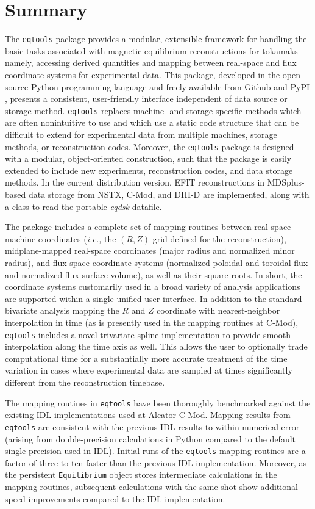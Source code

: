 \documentclass{elsarticle}
\newcommand{\ie}{\emph{i.e., }}
\newcommand{\eqtools}{\texttt{eqtools}\xspace}
\begin{document}
\section{Summary}\label{sec:summary}

The \eqtools package provides a modular, extensible framework for handling the basic tasks associated with magnetic equilibrium reconstructions for tokamaks -- namely, accessing derived quantities and mapping between real-space and flux coordinate systems for experimental data.
This package, developed in the open-source Python programming language and freely available from Github and PyPI \cite{eqtools_pypi,eqtools_git,eqtools_readthedocs}, presents a consistent, user-friendly interface independent of data source or storage method.
\eqtools replaces machine- and storage-specific methods which are often nonintuitive to use and which use a static code structure that can be difficult to extend for experimental data from multiple machines, storage methods, or reconstruction codes.
Moreover, the \eqtools package is designed with a modular, object-oriented construction, such that the package is easily extended to include new experiments, reconstruction codes, and data storage methods.
In the current distribution version, EFIT reconstructions \cite{Lao1985} in MDSplus-based data storage from NSTX, C-Mod, and DIII-D are implemented, along with a class to read the portable \emph{eqdsk} datafile.  

The package includes a complete set of mapping routines between real-space machine coordinates (\ie the $(R, Z)$ grid defined for the reconstruction), midplane-mapped real-space coordinates (major radius and normalized minor radius), and flux-space coordinate systems (normalized poloidal and toroidal flux and normalized flux surface volume), as well as their square roots.
In short, the coordinate systems customarily used in a broad variety of analysis applications are supported within a single unified user interface.  
In addition to the standard bivariate analysis mapping the $R$ and $Z$ coordinate with nearest-neighbor interpolation in time (as is presently used in the mapping routines at C-Mod), \eqtools includes a novel trivariate spline implementation to provide smooth interpolation along the time axis as well.  
This allows the user to optionally trade computational time for a substantially more accurate treatment of the time variation in cases where experimental data are sampled at times significantly different from the reconstruction timebase.

The mapping routines in \eqtools have been thoroughly benchmarked against the existing IDL implementations used at Alcator C-Mod.  
Mapping results from \eqtools are consistent with the previous IDL results to within numerical error (arising from double-precision calculations in Python compared to the default single precision used in IDL).
Initial runs of the \eqtools mapping routines are a factor of three to ten faster than the previous IDL implementation.
Moreover, as the persistent \verb|Equilibrium| object stores intermediate calculations in the mapping routines, subsequent calculations with the same shot show additional speed improvements compared to the IDL implementation.
\end{document}

